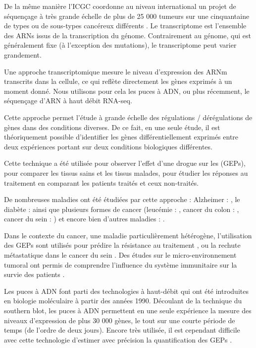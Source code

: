 			De la même manière l'\ac{ICGC} coordonne au niveau international un projet de séquençage à très grande échelle de plus de 25 000 tumeurs sur une cinquantaine de types ou de sous-types cancéreux différents \citep{ICGC2010}.
			Le transcriptome est l'ensemble des \acsp{ARN} issus de la transcription du génome.
			Contrairement au génome, qui est généralement fixe (à l'exception des mutations), le transcriptome peut varier grandement.

			Une approche transcriptomique mesure le niveau d'expression des \acs{ARNm} transcrits dans la cellule, ce qui reflète directement les gènes exprimés à un moment donné.
			Nous utilisons pour cela les puces à \acs{ADN}, ou plus récemment, le séquençage d'\acs{ARN} à haut débit \acs{RNA}-seq.

			Cette approche permet l'étude à grande échelle des régulations / dérégulations de gènes dans des conditions diverses.
			De ce fait, en une seule étude, il est théoriquement possible d'identifier les gènes différentiellement exprimés entre deux expériences portant sur deux conditions biologiques différentes.

			Cette technique a été utilisée pour observer l'effet d'une drogue sur les (\acp{GEP}), pour comparer les tissus sains et les tissus malades, pour étudier les réponses au traitement en comparant les patients traités et ceux non-traités.

			De nombreuses maladies ont été étudiées par cette approche : Alzheimer : \citet{Ricciarelli2004}, le diabète : \citet{Kaestner2003} ainsi que plusieurs formes de cancer (leucémie : \citet{Golub1999}, cancer du colon : \citet{Li2001}, cancer du sein : \citet{Wang2005}) et encore bien d'autres maladies : \citet{Munro2009}.

			Dans le contexte du cancer, une maladie particulièrement hétérogène, l'utilisation des \acp{GEP} sont utilisés pour prédire la résistance au traitement \citep{DeLavallade2010}, ou la rechute métastatique dans le cancer du sein \citep{vandevijver2002}.
			Des études sur le micro-environnement tumoral ont permis de comprendre l'influence du système immunitaire sur la survie des patients \citep{Pages2010}.

			Les puces à \acs{ADN} font parti des technologies à haut-débit qui ont été introduites en biologie moléculaire à partir des années 1990.
			Découlant de la technique du southern blot, les puces à \acs{ADN} permettent en une seule expérience la mesure des niveaux d'expression de plus 30 000 gènes, le tout sur une courte période de temps (de l'ordre de deux jours).
			Encore très utilisée, il est cependant difficile avec cette technologie d'estimer avec précision la quantification des \acp{GEP} \citep{Heller2002, Hardiman2004, Wang2005b, Zakharkin2005, Draghici2006}.

